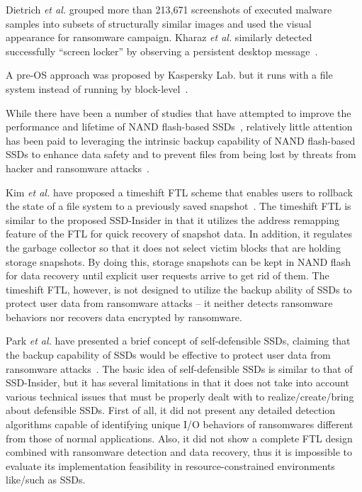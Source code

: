 \documentclass[conference]{IEEEtran}
\newcommand{\etal}{{\it et al.}\xspace}
\newcommand{\ours}{SSD-Insider}
\begin{document}
Dietrich \etal grouped more than 213,671 screenshots of executed
malware samples into subsets of structurally similar images and
used the visual appearance for ransomware campaign. Kharaz \etal
similarly detected successfully ``screen locker'' by observing a
persistent desktop message~\cite{kharaz}.

A pre-OS approach was proposed by Kaspersky Lab. but it runs with a
file system instead of running by block-level~\cite{gusarov14}.

While there have been a number of studies that have attempted to
improve the performance and lifetime of NAND flash-based
SSDs~\cite{kim2002space, seong2010hydra}, relatively little
attention has been paid to leveraging the intrinsic backup
capability of NAND flash-based SSDs to enhance data safety and to
prevent files from being lost by threats from hacker and ransomware
attacks~\cite{paikposter}.

Kim \textit{et al.} have proposed a timeshift FTL scheme that
enables users to rollback the state of a file system to a
previously saved snapshot~\cite{ltftl}. The timeshift FTL is
similar to the proposed \ours{} in that it utilizes the address
remapping feature of the FTL for quick recovery of snapshot data.
In addition, it regulates the garbage collector so that it does not
select victim blocks that are holding storage snapshots. By doing
this, storage snapshots can be kept in NAND flash for data recovery
until explicit user requests arrive to get rid of them. The
timeshift FTL, however, is not designed to utilize the backup
ability of SSDs to protect user data from ransomware attacks – it
neither detects ransomware behaviors nor recovers data encrypted by
ransomware. 

Park \textit{et al.} have presented a brief concept of
self-defensible SSDs, claiming that the backup capability of SSDs
would be effective to protect user data from ransomware
attacks~\cite{paikposter}. The basic idea of self-defensible SSDs
is similar to that of \ours{}, but it has several limitations in that
it does not take into account various technical issues that must be
properly dealt with to realize/create/bring about defensible SSDs.
First of all, it did not present any detailed detection algorithms
capable of identifying unique I/O behaviors of ransomwares
different from those of normal applications. Also, it did not show
a complete FTL design combined with ransomware detection and data
recovery, thus it is impossible to evaluate its implementation
feasibility in resource-constrained environments like/such as SSDs.  
\end{document}
